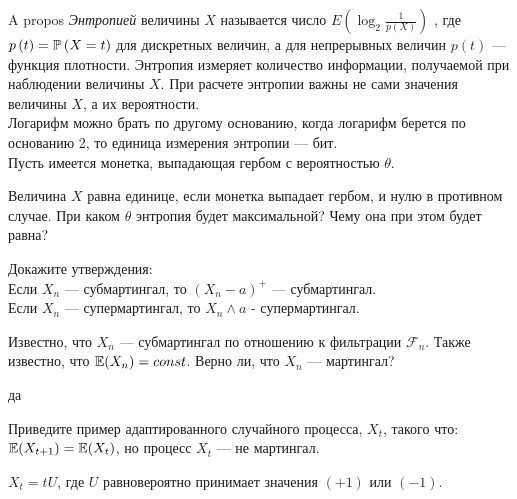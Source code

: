 \begin{problem}
A propos
{\it Энтропией} величины  $X$  называется число $E\left(\log _{2}
\frac{1}{p\left(X\right)} \right)$ , где
$p\left(t\right)=\P\left(X=t\right)$  для дискретных величин, а для
непрерывных величин  $p\left(t\right)$  — функция плотности. Энтропия
измеряет количество информации, получаемой при наблюдении величины
$X$. При расчете энтропии важны не сами значения величины $X$, а
их вероятности. \\
Логарифм можно брать по другому основанию, когда логарифм берется
по основанию 2, то единица измерения энтропии — бит. \\
Пусть имеется монетка, выпадающая гербом с вероятностью  $\theta$.

Величина  $X$  равна единице, если монетка выпадает гербом, и нулю
в противном случае. При каком  $\theta$  энтропия будет
максимальной? Чему она при этом будет равна?

\begin{sol}

\end{sol}
\end{problem}

\begin{problem}
Докажите утверждения: \\
Если $X_{n}$ — субмартингал, то $(X_{n}-a)^{+}$ — субмартингал. \\
Если $X_{n}$ — супермартингал, то $X_{n} \wedge a$ -
супермартингал.

\begin{sol}

\end{sol}
\end{problem}

\begin{problem}
Известно, что $X_{n}$ — субмартингал по отношению к фильтрации $\mathcal{F}_{n}$. Также известно, что $\E(X_{n})=const$. Верно ли, что $X_{n}$ — мартингал?

\begin{sol}
да
\end{sol}
\end{problem}

\begin{problem}
Приведите пример адаптированного случайного процесса, $X_t$, такого что: $\E(X_{t+1})=\E(X_t)$, но процесс $X_t$ — не мартингал.

\begin{sol}
$X_t=tU$, где $U$ равновероятно принимает значения $(+1)$ или $(-1)$.
\end{sol}
\end{problem}

